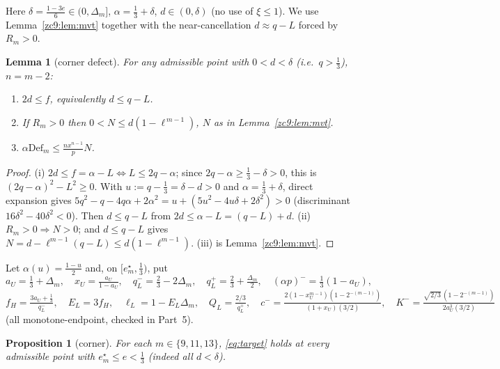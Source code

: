 \documentclass[11pt]{amsart}
\newtheorem{lemma}[theorem]{Lemma}
\newtheorem{proposition}[theorem]{Proposition}
\newcommand{\Def}{\mathrm{Def}}
\begin{document}
Here $\delta=\tfrac{1-3e}6\in(0,\Delta_m]$, $\alpha=\tfrac13+\delta$,
$d\in(0,\delta)$ (no use of $\xi\le1$).  We use Lemma~\ref{zc9:lem:mvt} together
with the near-cancellation $d\approx q-L$ forced by $R_m>0$.

\begin{lemma}[corner defect]\label{zc9:lem:cornerN}
For any admissible point with $0<d<\delta$ (i.e.\ $q>\tfrac13$), $n=m-2$:
\begin{enumerate}
\item[(i)] $2d\le f$, equivalently $d\le q-L$.
\item[(ii)] If $R_m>0$ then $0<N\le d(1-\ell^{\,m-1})$, $N$ as in
 Lemma~\ref{zc9:lem:mvt}.
\item[(iii)] $\alpha\Def_m\le\tfrac{n x^{n-1}}p N$.
\end{enumerate}
\end{lemma}

\begin{proof}
(i) $2d\le f=\alpha-L\iff L\le2q-\alpha$; since $2q-\alpha\ge\tfrac13-\delta>0$,
this is $(2q-\alpha)^2-L^2\ge0$.  With $u:=q-\tfrac13=\delta-d>0$ and
$\alpha=\tfrac13+\delta$, direct expansion gives
$5q^2-q-4q\alpha+2\alpha^2=u+(5u^2-4u\delta+2\delta^2)>0$ (discriminant
$16\delta^2-40\delta^2<0$).  Then $d\le q-L$ from $2d\le\alpha-L=(q-L)+d$.
(ii) $R_m>0\Rightarrow N>0$; and $d\le q-L$ gives
$N=d-\ell^{m-1}(q-L)\le d(1-\ell^{m-1})$.  (iii) is Lemma~\ref{zc9:lem:mvt}.
\end{proof}

Let $\alpha(u)=\tfrac{1-u}2$ and, on $[e^\star_m,\tfrac13)$, put
\[
 a_U=\tfrac13+\Delta_m,\quad x_U=\tfrac{a_U}{1-a_U},\quad
 q_L^-=\tfrac23-2\Delta_m,\quad q_L^+=\tfrac23+\tfrac{\Delta_m}2,\quad
 (\alpha p)^-=\tfrac13(1-a_U),
\]
\[
 f_{\!H}=\tfrac{3a_U+\frac13}{q_L^-},\quad E_L=3f_{\!H},\quad
 \ell_L=1-E_L\Delta_m,\quad Q_L=\tfrac{2/3}{q_L^+},\quad
 c^-=\tfrac{2(1-x_U^{m-1})(1-2^{-(m-1)})}{(1+x_U)(3/2)},\quad
 K^-=\tfrac{\sqrt{2/3}\,(1-2^{-(m-1)})}{2a_U^3(3/2)}
\]
(all monotone-endpoint, checked in Part~5).

\begin{proposition}[corner]\label{zc9:prop:wide}
For each $m\in\{9,11,13\}$, \eqref{eq:target} holds at every admissible point
with $e^\star_m\le e<\tfrac13$ (indeed all $d<\delta$).
\end{proposition}
\end{document}
